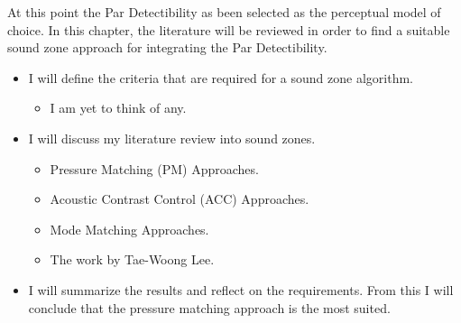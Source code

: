 At this point the Par Detectibility as been selected as the perceptual model of choice.
In this chapter, the literature will be reviewed in order to find a suitable sound zone approach for integrating the Par Detectibility.
\begin{itemize}
    \item I will define the criteria that are required for a sound zone algorithm.
        \begin{itemize}
            \item I am yet to think of any.
        \end{itemize}
    \item I will discuss my literature review into sound zones.
        \begin{itemize}
            \item Pressure Matching (PM) Approaches.
            \item Acoustic Contrast Control (ACC) Approaches.
            \item Mode Matching Approaches.
            \item The work by Tae-Woong Lee.
        \end{itemize}
    \item I will summarize the results and reflect on the requirements.
        From this I will conclude that the pressure matching approach is the most suited.
\end{itemize}
